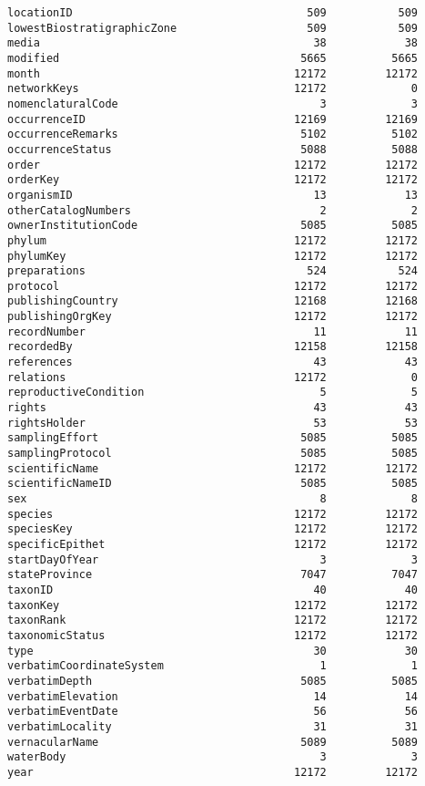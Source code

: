 \documentclass[11pt]{article}
\begin{document}
\begin{Verbatim}[commandchars=\\\{\}]
locationID                                    509           509
lowestBiostratigraphicZone                    509           509
media                                          38            38
modified                                     5665          5665
month                                       12172         12172
networkKeys                                 12172             0
nomenclaturalCode                               3             3
occurrenceID                                12169         12169
occurrenceRemarks                            5102          5102
occurrenceStatus                             5088          5088
order                                       12172         12172
orderKey                                    12172         12172
organismID                                     13            13
otherCatalogNumbers                             2             2
ownerInstitutionCode                         5085          5085
phylum                                      12172         12172
phylumKey                                   12172         12172
preparations                                  524           524
protocol                                    12172         12172
publishingCountry                           12168         12168
publishingOrgKey                            12172         12172
recordNumber                                   11            11
recordedBy                                  12158         12158
references                                     43            43
relations                                   12172             0
reproductiveCondition                           5             5
rights                                         43            43
rightsHolder                                   53            53
samplingEffort                               5085          5085
samplingProtocol                             5085          5085
scientificName                              12172         12172
scientificNameID                             5085          5085
sex                                             8             8
species                                     12172         12172
speciesKey                                  12172         12172
specificEpithet                             12172         12172
startDayOfYear                                  3             3
stateProvince                                7047          7047
taxonID                                        40            40
taxonKey                                    12172         12172
taxonRank                                   12172         12172
taxonomicStatus                             12172         12172
type                                           30            30
verbatimCoordinateSystem                        1             1
verbatimDepth                                5085          5085
verbatimElevation                              14            14
verbatimEventDate                              56            56
verbatimLocality                               31            31
vernacularName                               5089          5089
waterBody                                       3             3
year                                        12172         12172


\end{Verbatim}
\end{document}
